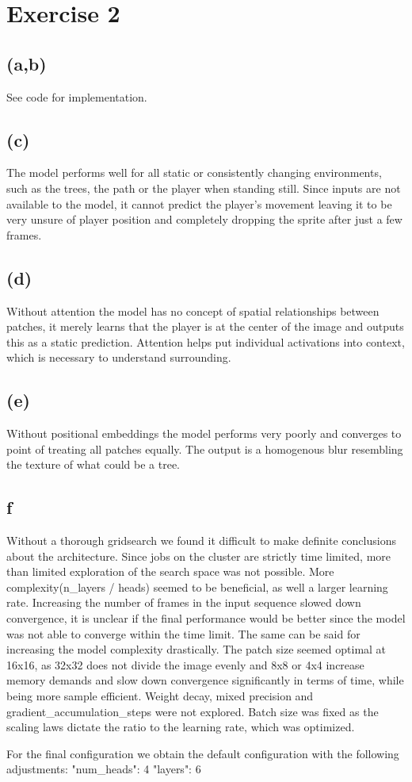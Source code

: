 \documentclass[11pt]{article}
\numberwithin{equation}{section}
\begin{document}
\section*{Exercise 2}
\subsection*{(a,b)}
See code for implementation.

\subsection*{(c)}
The model performs well for all static or consistently changing environments, such as the trees, the path or the player when standing still.
Since inputs are not available to the model, it cannot predict the player's movement leaving it to be very unsure of player position and completely dropping the sprite after just a few frames.

\subsection*{(d)}
Without attention the model has no concept of spatial relationships between patches, it merely learns that the player is at the center of the image and outputs this as a static prediction. Attention helps put individual activations into context, which is necessary to understand surrounding.

\subsection*{(e)}
Without positional embeddings the model performs very poorly and converges to point of treating all patches equally. The output is a homogenous blur resembling the texture of what could be a tree.

\subsection*{f}
Without a thorough gridsearch we found it difficult to make definite conclusions about the architecture. Since jobs on the cluster are strictly time limited, more than limited exploration of the search space was not possible.
More complexity(n\_layers / heads) seemed to be beneficial, as well a larger learning rate. Increasing the number of frames in the input sequence slowed down convergence, it is unclear if the final performance would be better since the model was not able to converge within the time limit.
The same can be said for increasing the model complexity drastically.
The patch size seemed optimal at 16x16, as 32x32 does not divide the image evenly and 8x8 or 4x4 increase memory demands and slow down convergence significantly in terms of time, while being more sample efficient.
Weight decay, mixed precision and gradient\_accumulation\_steps were not explored.
Batch size was fixed as the scaling laws dictate the ratio to the learning rate, which was optimized.

For the final configuration we obtain the default configuration with the following adjustments:
"num\_heads": 4
\newline
"layers": 6
\end{document}
